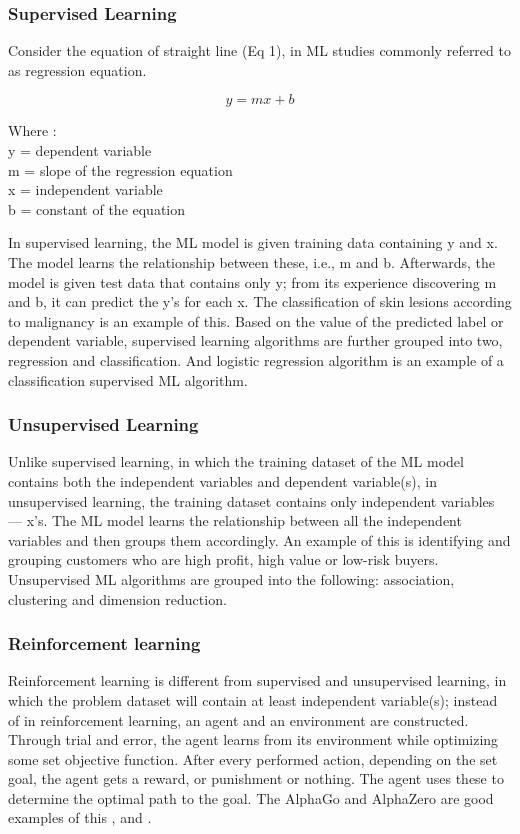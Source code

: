 \documentclass[conference]{IEEEtran}
\begin{document}
\subsubsection{Supervised Learning}
Consider the equation of straight line (Eq 1), in ML studies commonly referred to as regression equation.
               
\begin{equation} 
\label{equ1}
y = mx+b 
\end{equation} 

Where :\\
y = dependent variable \\
m = slope of the regression equation\\
x = independent variable\\
b = constant of the equation

In supervised learning, the ML model is given training data containing y and x. The model learns the relationship between these, i.e., m and b. Afterwards, the model is given test data that contains only y; from its experience discovering m and b, it can predict the y's for each x. The classification of skin lesions according to malignancy is an example of this\cite{bb3}. Based on the value of the predicted label or dependent variable, supervised learning algorithms are further grouped into two, regression and classification. And logistic regression algorithm is an example of a classification supervised ML algorithm.\\

\subsubsection{Unsupervised Learning}
Unlike supervised learning, in which the training dataset of the ML model contains both the independent variables and dependent variable(s), in unsupervised learning, the training dataset contains only independent variables — x's. The ML model learns the relationship between all the independent variables and then groups them accordingly. An example of this is identifying and grouping customers who are high profit, high value or low-risk buyers\cite{bb4}. Unsupervised ML algorithms are grouped into the following: association, clustering and dimension reduction.

\subsubsection{Reinforcement learning}
Reinforcement learning is different from supervised and unsupervised learning, in which the problem dataset will contain at least independent variable(s); instead of in reinforcement learning, an agent and an environment are constructed. Through trial and error, the agent learns from its environment while optimizing some set objective function. After every performed action, depending on the set goal, the agent gets a reward, or punishment or nothing. The agent uses these to determine the optimal path to the goal. The AlphaGo and AlphaZero are good examples of this \cite{bb3}, and \cite{bb5}.
\end{document}
